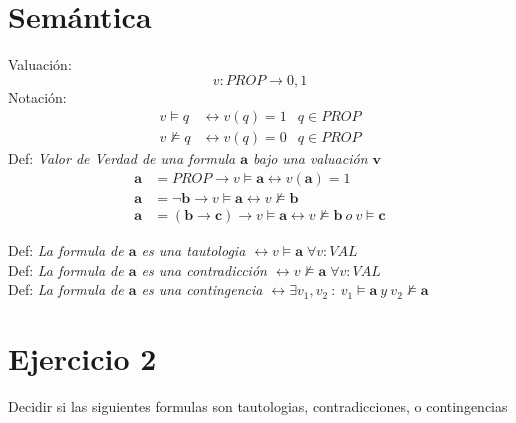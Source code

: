 \documentclass[14pt,a4paper,fleqn]{article}
\newcommand{\entonces}{\rightarrow}
\newcommand{\no}[1]{\neg #1}
\newcommand{\satisface}{\vDash}
\newcommand{\nosatisf}{\nvDash}
\newcommand{\sii}{\leftrightarrow}
\begin{document}
\section*{Semántica}
Valuación:
\begin{equation*}
	v:PROP \entonces {0,1}
\end{equation*}
Notación:
\begin{align*}
	v \models q &\sii v(q)=1 & q \in PROP \\
	v \nvDash q &\sii v(q)=0 & q \in PROP
\end{align*}
Def: \textit{Valor de Verdad de una formula $\mathbf{a}$ bajo una valuación $\mathbf{v}$}
\begin{align*}
	\mathbf{a} &= PROP \entonces v \satisface \mathbf{a} \sii v(\mathbf{a})=1 \\
	\mathbf{a} &= \no \mathbf{b} \entonces v \satisface \mathbf{a} \sii v \nosatisf \mathbf{b} \\
	\mathbf{a} &= (\mathbf{b} \entonces \mathbf{c}) \entonces v \satisface \mathbf{a} \sii v \nosatisf \mathbf{b} \: o \: v \satisface \mathbf{c}
\end{align*}

Def: \textit{La formula de $\mathbf{a}$ es una tautologia $\sii v \satisface \mathbf{a}\; \forall v:VAL$} \\
Def: \textit{La formula de $\mathbf{a}$ es una contradicción $\sii v \nosatisf \mathbf{a}\; \forall v:VAL$} \\
Def: \textit{La formula de $\mathbf{a}$ es una contingencia $\sii \exists v_{1}, v_{2}\: : \: v_{1} \satisface \mathbf{a} \: y\: v_{2} \nosatisf \mathbf{a}$} \\

\section*{Ejercicio 2}
\noindent Decidir si las siguientes formulas son tautologias, contradicciones, o contingencias
\end{document}

